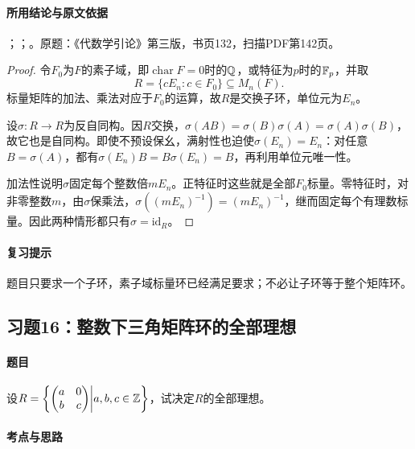 \paragraph{所用结论与原文依据}

；；。原题：《代数学引论》第三版，书页132，扫描PDF第142页。


\begin{proof}

令$F_0$为$F$的素子域，即$\operatorname{char}F=0$时的$\mathbb Q$，或特征为$p$时的$\mathbb F_p$，并取
\[
R=\{cE_n:c\in F_0\}\subseteq M_n(F).
\]
标量矩阵的加法、乘法对应于$F_0$的运算，故$R$是交换子环，单位元为$E_n$。

设$\sigma:R\to R$为反自同构。因$R$交换，$\sigma(AB)=\sigma(B)\sigma(A)=\sigma(A)\sigma(B)$，故它也是自同构。即使不预设保幺，满射性也迫使$\sigma(E_n)=E_n$：对任意$B=\sigma(A)$，都有$\sigma(E_n)B=B\sigma(E_n)=B$，再利用单位元唯一性。

加法性说明$\sigma$固定每个整数倍$mE_n$。正特征时这些就是全部$F_0$标量。零特征时，对非零整数$m$，由$\sigma$保乘法，$\sigma((mE_n)^{-1})=(mE_n)^{-1}$，继而固定每个有理数标量。因此两种情形都只有$\sigma=\mathrm{id}_R$。

\end{proof}

\paragraph{复习提示}

题目只要求一个子环，素子域标量环已经满足要求；不必让子环等于整个矩阵环。



\subsection{习题16：整数下三角矩阵环的全部理想}

\label{ex:3:16}

\paragraph{题目}

设$R=\left\{\begin{pmatrix}a&0\\b&c\end{pmatrix}\middle|a,b,c\in\mathbb Z\right\}$，试决定$R$的全部理想。

\paragraph{考点与思路}

